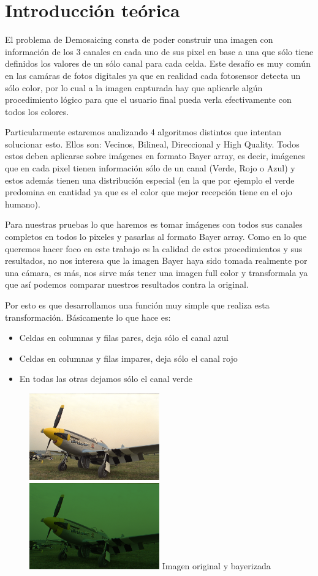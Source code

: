 \section{Introducci\'on te\'orica}

El problema de Demosaicing consta de poder construir una imagen con información de los 3 canales en cada uno de sus pixel en base a una que sólo tiene definidos los valores de un sólo canal para cada celda. Este desafío es muy común en las camáras de fotos digitales ya que en realidad cada fotosensor detecta un sólo color, por lo cual a la imagen capturada hay que aplicarle algún procedimiento lógico para que el usuario final pueda verla efectivamente con todos los colores.

Particularmente estaremos analizando 4 algoritmos distintos que intentan solucionar esto. Ellos son: Vecinos, Bilineal, Direccional y High Quality. Todos estos deben aplicarse sobre imágenes en formato Bayer array, es decir, imágenes que en cada pixel tienen información sólo de un canal (Verde, Rojo o Azul) y estos además tienen una distribución especial (en la que por ejemplo el verde predomina en cantidad ya que es el color que mejor recepción tiene en el ojo humano).

Para nuestras pruebas lo que haremos es tomar imágenes con todos sus canales completos en todos lo pixeles y pasarlas al formato Bayer array. Como en lo que queremos hacer foco en este trabajo es la calidad de estos procedimientos y sus resultados, no nos interesa que la imagen Bayer haya sido tomada realmente por una cámara, es más, nos sirve más tener una imagen full color y transformala ya que así podemos comparar nuestros resultados contra la original.

Por esto es que desarrollamos una función muy simple que realiza esta transformación. Básicamente lo que hace es: 
\begin{itemize}
\item Celdas en columnas y filas pares, deja sólo el canal azul
\item Celdas en columnas y filas impares, deja sólo el canal rojo
\item En todas las otras dejamos sólo el canal verde
\end{itemize}   


\begin{figure}[h]
       \includegraphics[width=0.5\textwidth]{imagenes/img9.png}
           \hfill
        \includegraphics[width=0.5\textwidth]{imagenes/img9_bayer.png}   
        Imagen original y bayerizada
\end{figure}
